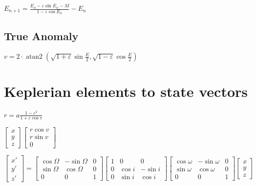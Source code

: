 \documentclass{article}
\DeclareMathOperator{\atantwo}{atan2}
\begin{document}
$ E_{n+1} = \frac{E_n - \varepsilon \sin{E_n} - M }{1 - \varepsilon \cos{E_n}}-E_n $

\subsection{True Anomaly}

$ v = 2 \cdot \atantwo(\sqrt{1+\varepsilon} \sin{\frac{E}{2}}, \sqrt{1-\varepsilon} \cos{\frac{E}{2}}) $

\section{Keplerian elements to state vectors}

$ r = a \frac{1-\varepsilon^2}{1+\varepsilon \cos{v}} $

$ \begin{bmatrix}
	x \\
	y \\
	z
\end{bmatrix}
\begin{bmatrix}
	r \cos{v} \\
	r \sin{v} \\
	0
\end{bmatrix}$

$\begin{bmatrix}
	x' \\
	y' \\
	z'
\end{bmatrix}
=
\begin{bmatrix}
	\cos\Omega & -\sin\Omega  & 0 \\
	\sin\Omega & \cos\Omega  & 0  \\
	0 & 0 & 1
\end{bmatrix}
\begin{bmatrix}
	1 & 0  & 0 \\
	0 & \cos i  & -\sin i  \\
	0 & \sin i & \cos i
\end{bmatrix}
\begin{bmatrix}
	\cos\omega & -\sin\omega  & 0 \\
	\sin\omega & \cos\omega  & 0  \\
	0 & 0 & 1
\end{bmatrix}
\begin{bmatrix}
	x \\
	y \\
	z
\end{bmatrix}$
\end{document}
